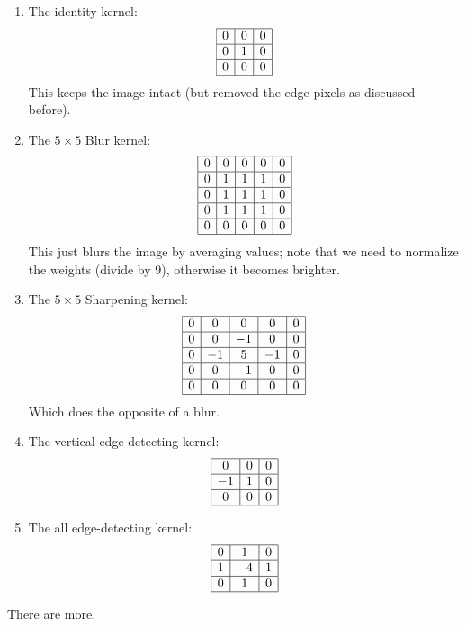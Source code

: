 \documentclass[12pt]{article}
\begin{document}
\begin{enumerate}[label = \numbers]
    \item 
    The identity kernel:
    \[ \begin{array}{|c|c|c|} \hline
    0 & 0 & 0 \\ \hline
    0 & 1 & 0 \\ \hline
    0 & 0 & 0 \\ \hline
    \end{array} \]
    This keeps the image intact (but removed
    the edge pixels as discussed before).
    \item 
    The $5\times 5$ Blur kernel:
    \[ \begin{array}{|c|c|c|c|c|} \hline
    0 & 0 & 0 & 0 & 0 \\ \hline
    0 & 1 & 1 & 1 & 0 \\ \hline
    0 & 1 & 1 & 1 & 0 \\ \hline
    0 & 1 & 1 & 1 & 0 \\ \hline
    0 & 0 & 0 & 0 & 0 \\ \hline
    \end{array} \]
    This just blurs the image by averaging values;
    note that we need to normalize the weights
    (divide by $9$),
    otherwise it becomes brighter.
    \item 
    The $5\times 5$ Sharpening kernel:
    \[ \begin{array}{|c|c|c|c|c|} \hline
    0 & 0 & 0 & 0 & 0 \\ \hline
    0 & 0 & -1 & 0 & 0 \\ \hline
    0 & -1 & 5 & -1 & 0 \\ \hline
    0 & 0 & -1 & 0 & 0 \\ \hline
    0 & 0 & 0 & 0 & 0 \\ \hline
    \end{array} \]
    Which does the opposite of a blur.
    \item 
    The vertical edge-detecting kernel:
    \[ \begin{array}{|c|c|c|} \hline
    0 & 0 & 0 \\ \hline
    -1 & 1 & 0 \\ \hline
    0 & 0 & 0 \\ \hline
    \end{array} \]
    \item 
    The all edge-detecting kernel:
    \[ \begin{array}{|c|c|c|} \hline
    0 & 1 & 0 \\ \hline
    1 & -4 & 1 \\ \hline
    0 & 1 & 0 \\ \hline
    \end{array} \]
\end{enumerate}
There are more. \\
\end{document}
